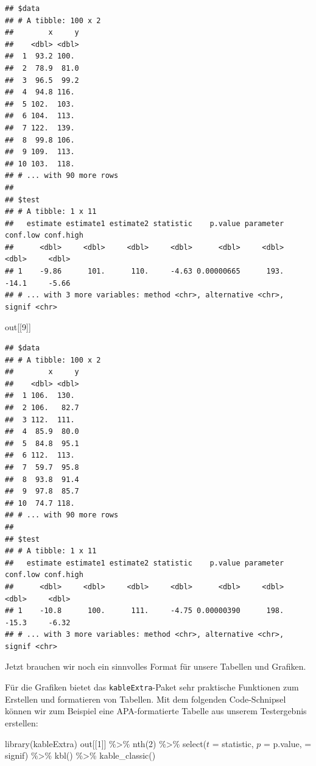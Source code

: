 \documentclass[
]{book}
\newenvironment{Shaded}{\begin{snugshade}}{\end{snugshade}}
\newcommand{\AttributeTok}[1]{\textcolor[rgb]{0.77,0.63,0.00}{#1}}
\newcommand{\DecValTok}[1]{\textcolor[rgb]{0.00,0.00,0.81}{#1}}
\newcommand{\FunctionTok}[1]{\textcolor[rgb]{0.00,0.00,0.00}{#1}}
\newcommand{\NormalTok}[1]{#1}
\newcommand{\OtherTok}[1]{\textcolor[rgb]{0.56,0.35,0.01}{#1}}
\newcommand{\SpecialCharTok}[1]{\textcolor[rgb]{0.00,0.00,0.00}{#1}}
\newcommand{\StringTok}[1]{\textcolor[rgb]{0.31,0.60,0.02}{#1}}
\begin{document}
\begin{verbatim}
## $data
## # A tibble: 100 x 2
##        x     y
##    <dbl> <dbl>
##  1  93.2 100. 
##  2  78.9  81.0
##  3  96.5  99.2
##  4  94.8 116. 
##  5 102.  103. 
##  6 104.  113. 
##  7 122.  139. 
##  8  99.8 106. 
##  9 109.  113. 
## 10 103.  118. 
## # ... with 90 more rows
## 
## $test
## # A tibble: 1 x 11
##   estimate estimate1 estimate2 statistic    p.value parameter conf.low conf.high
##      <dbl>     <dbl>     <dbl>     <dbl>      <dbl>     <dbl>    <dbl>     <dbl>
## 1    -9.86      101.      110.     -4.63 0.00000665      193.    -14.1     -5.66
## # ... with 3 more variables: method <chr>, alternative <chr>, signif <chr>
\end{verbatim}

\begin{Shaded}
\begin{Highlighting}[]
\NormalTok{out[[}\DecValTok{9}\NormalTok{]]}
\end{Highlighting}
\end{Shaded}

\begin{verbatim}
## $data
## # A tibble: 100 x 2
##        x     y
##    <dbl> <dbl>
##  1 106.  130. 
##  2 106.   82.7
##  3 112.  111. 
##  4  85.9  80.0
##  5  84.8  95.1
##  6 112.  113. 
##  7  59.7  95.8
##  8  93.8  91.4
##  9  97.8  85.7
## 10  74.7 118. 
## # ... with 90 more rows
## 
## $test
## # A tibble: 1 x 11
##   estimate estimate1 estimate2 statistic    p.value parameter conf.low conf.high
##      <dbl>     <dbl>     <dbl>     <dbl>      <dbl>     <dbl>    <dbl>     <dbl>
## 1    -10.8      100.      111.     -4.75 0.00000390      198.    -15.3     -6.32
## # ... with 3 more variables: method <chr>, alternative <chr>, signif <chr>
\end{verbatim}

Jetzt brauchen wir noch ein sinnvolles Format für unsere Tabellen und Grafiken.

Für die Grafiken bietet das \texttt{kableExtra}-Paket sehr praktische Funktionen zum Erstellen und formatieren von Tabellen. Mit dem folgenden Code-Schnipsel können wir zum Beispiel eine APA-formatierte Tabelle aus unserem Testergebnis erstellen:

\begin{Shaded}
\begin{Highlighting}[]
\FunctionTok{library}\NormalTok{(kableExtra)}
\NormalTok{out[[}\DecValTok{1}\NormalTok{]] }\SpecialCharTok{\%\textgreater{}\%} 
  \FunctionTok{nth}\NormalTok{(}\DecValTok{2}\NormalTok{) }\SpecialCharTok{\%\textgreater{}\%} 
  \FunctionTok{select}\NormalTok{(}\StringTok{\textasciigrave{}}\AttributeTok{$t$}\StringTok{\textasciigrave{}} \OtherTok{=}\NormalTok{ statistic,}
         \StringTok{\textasciigrave{}}\AttributeTok{$p$}\StringTok{\textasciigrave{}} \OtherTok{=}\NormalTok{ p.value,}
         \StringTok{\textasciigrave{}}\AttributeTok{ }\StringTok{\textasciigrave{}} \OtherTok{=}\NormalTok{ signif) }\SpecialCharTok{\%\textgreater{}\%} 
  \FunctionTok{kbl}\NormalTok{() }\SpecialCharTok{\%\textgreater{}\%} 
  \FunctionTok{kable\_classic}\NormalTok{()}
\end{Highlighting}
\end{Shaded}
\end{document}
